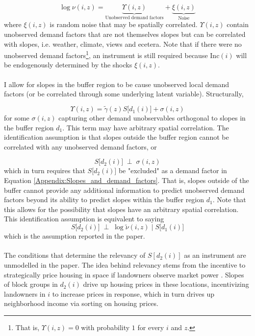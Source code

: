 \documentclass[12pt]{article}
\begin{document}
	\begin{equation*}
		\log \nu(i, z) = \underbrace{\Upsilon(i,z)}_{\text{Unobserved demand factors}} +  \underbrace{\xi(i, z)}_{\text{Noise}}
	\end{equation*}
	where $\xi(i, z)$ is random noise that may be spatially correlated. $\Upsilon(i, z)$ contain unobserved demand factors that are not themselves slopes but can be correlated with slopes, i.e. weather, climate, views and ecetera. Note that if there were no unobserved demand factors\footnote{That is, $\Upsilon(i, z) = 0$ with probability $1$ for every $i$ and $z$.}, an instrument is still required because $\text{Inc}(i)$ will be endogenously determined by the shocks $\xi(i, z)$.  
	
	\paragraph*{}
	I allow for slopes in the buffer region to be cause unobserved local demand factors (or be correlated through some underlying latent variable). Structurally,
	
	\begin{equation}\label{Appendix:Slopes_and_demand_factors}
		\Upsilon(i,z) = \tilde{\gamma}(z)S\big[d_{1}(i)\big] + \sigma(i, z)
	\end{equation}
	for some $\sigma(i, z)$ capturing other demand unobservables orthogonal to slopes in the buffer region $d_{1}$. This term may have arbitrary spatial correlation. The identification assumption is that slopes outside the buffer region cannot be correlated with any unobserved demand factors, or
	
	\begin{equation}
		S\big[d_{2}(i)\big] \; \perp \; \sigma(i, z)
	\end{equation}
	which in turn requires that $S\big[d_{2}(i)\big]$ be "excluded" as a demand factor in Equation \eqref{Appendix:Slopes_and_demand_factors}. That is, slopes outside of the buffer cannot provide any additional information to predict unobserved demand factors beyond its ability to predict slopes within the buffer region $d_{1}$. Note that this allows for the possibility that slopes have an arbitrary spatial correlation. This identification assumption is equivalent to saying $$S\big[d_{2}(i)\big] \; \perp \; \log \tilde{\nu}(i, z) \; |  \; S\big[d_{1}(i)\big]$$
	which is the assumption reported in the paper.
	
	\paragraph*{}
	The conditions that determine the relevancy of $S[d_{2}(i)]$ as an instrument are unmodelled in the paper. The idea behind relevancy stems from the incentive to strategically price housing in space if landowners observe market power \citep{BFMJPE, anagoletal2021}. Slopes of block groups in $d_{2}(i)$ drive up housing prices in these locations, incentivizing landowners in $i$ to increase prices in response, which in turn drives up neighborhood income via sorting on housing prices.  
	
\end{document}
